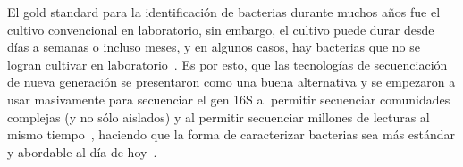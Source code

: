 


El gold standard para la identificación de bacterias durante muchos años fue el cultivo convencional en laboratorio, sin embargo, el cultivo puede durar desde días a semanas o incluso meses, y en algunos casos, hay bacterias que no se logran cultivar en laboratorio~\cite{didelot2012transforming}. 
Es por esto, que las tecnologías de secuenciación de nueva generación se presentaron como una buena alternativa y se empezaron a usar masivamente para secuenciar el gen 16S al permitir secuenciar comunidades complejas (y no sólo aislados) y al permitir secuenciar millones de lecturas al mismo tiempo~\cite{reller2007detection}, haciendo que la forma de caracterizar bacterias sea más estándar y abordable al día de hoy~\cite{woo2008then, tanner1994impact}. 





